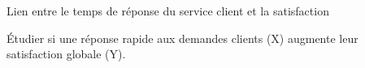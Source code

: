 \documentclass[11pt]{article}
\begin{document}
    Lien entre le temps de réponse du service client et la satisfaction

    Étudier si une réponse rapide aux demandes clients (X) augmente leur satisfaction globale (Y).
\end{document}
